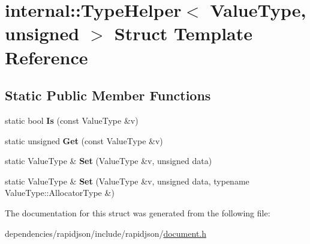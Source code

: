 \hypertarget{structinternal_1_1_type_helper_3_01_value_type_00_01unsigned_01_4}{}\section{internal\+:\+:Type\+Helper$<$ Value\+Type, unsigned $>$ Struct Template Reference}
\label{structinternal_1_1_type_helper_3_01_value_type_00_01unsigned_01_4}
\subsection*{Static Public Member Functions}
\begin{DoxyCompactItemize}
\item 
\mbox{\label{structinternal_1_1_type_helper_3_01_value_type_00_01unsigned_01_4_ad1c1cb931ed166508d17e866d410c99b}} 
static bool {\bfseries Is} (const Value\+Type \&v)
\item 
\mbox{\label{structinternal_1_1_type_helper_3_01_value_type_00_01unsigned_01_4_a2f91befe1e9e914e7431b84c0d89f572}} 
static unsigned {\bfseries Get} (const Value\+Type \&v)
\item 
\mbox{\label{structinternal_1_1_type_helper_3_01_value_type_00_01unsigned_01_4_a1d960542fd618ac649fe4e045c44f789}} 
static Value\+Type \& {\bfseries Set} (Value\+Type \&v, unsigned data)
\item 
\mbox{\label{structinternal_1_1_type_helper_3_01_value_type_00_01unsigned_01_4_a601b05a233b6025486a9105d45d46780}} 
static Value\+Type \& {\bfseries Set} (Value\+Type \&v, unsigned data, typename Value\+Type\+::\+Allocator\+Type \&)
\end{DoxyCompactItemize}


The documentation for this struct was generated from the following file\+:\begin{DoxyCompactItemize}
\item 
dependencies/rapidjson/include/rapidjson/\hyperlink{document_8h}{document.\+h}\end{DoxyCompactItemize}
